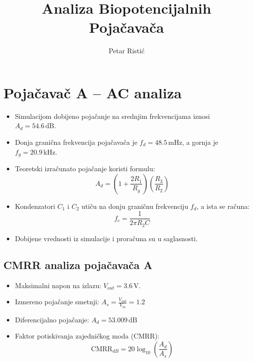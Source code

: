 \documentclass[a4paper]{article}
\title{Analiza Biopotencijalnih Poja\v{c}ava\v{c}a}
\subtitle{}
\author{Petar Risti\'{c}}
\begin{document}
\maketitle

\newpage
{}

\section*{Poja\v{c}ava\v{c} A -- AC analiza}
\begin{itemize}
  \item Simulacijom dobijeno poja\v{c}anje na srednjim frekvencijama iznosi $A_d = 54.6\,\text{dB}$.
  \item Donja grani\v{c}na frekvencija poja\v{c}ava\v{c}a je $f_d = 48.5\,\text{mHz}$, a gornja je $f_g = 20.9\,\text{kHz}$.
  \item Teoretski izra\v{c}unato poja\v{c}anje koristi formulu:
    \[ A_d = \left(1 + \frac{2R_1}{R_g}\right)\left(\frac{R_3}{R_2}\right) \]
  \item Kondenzatori $C_1$ i $C_2$ uti\v{c}u na donju grani\v{c}nu frekvenciju $f_d$, a ista se ra\v{c}una:
    \[ f_c = \frac{1}{2\pi R_2 C} \]
  \item Dobijene vrednosti iz simulacije i prora\v{c}una su u saglasnosti.
\end{itemize}


\subsection*{CMRR analiza poja\v{c}ava\v{c}a A}
\begin{itemize}
  \item Maksimalni napon na izlazu: $V_{out} = 3.6\,\text{V}$.
  \item Izmereno poja\v{c}anje smetnji: $A_s = \frac{V_{out}}{V_{in}} = 1.2$
  \item Diferencijalno poja\v{c}anje: $A_d = 53.009\,\text{dB}$
  \item Faktor potiskivanja zajedni\v{c}kog moda (CMRR):
    \[ \text{CMRR}_{dB} = 20 \log_{10}\left(\frac{A_d}{A_s}\right) \]
\end{itemize}

\end{document}
